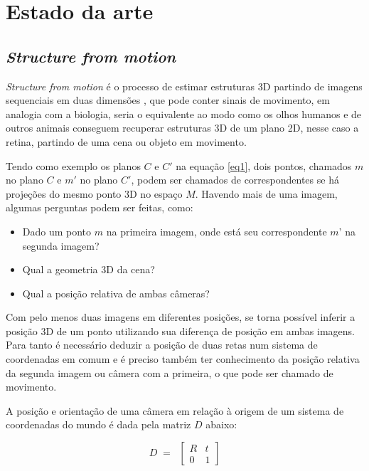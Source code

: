 
\chapter{Estado da arte}

\section{\textit{Structure from motion}}

\textit{Structure from motion} é o processo de estimar estruturas 3D partindo de imagens sequenciais em duas dimensões \cite{SFM}, que pode conter sinais de movimento, em analogia com a biologia, seria o equivalente ao modo  como os olhos humanos e de outros animais conseguem recuperar estruturas 3D de um plano 2D, nesse caso a retina, partindo de uma cena ou objeto em movimento.

Tendo como exemplo os planos $C$ e $C'$ na equação \eqref{eq1}, dois pontos, chamados $m$ no plano $C$ e $m'$ no plano $C'$, podem ser chamados de correspondentes se há projeções do mesmo ponto 3D no espaço $M$. Havendo mais de uma imagem, algumas perguntas podem ser feitas, como:

\begin{itemize}
	\item{Dado um ponto $m$ na primeira imagem, onde está seu correspondente $m’$ na segunda imagem?}
	\item{Qual a geometria 3D da cena?}
	\item{Qual a posição relativa de ambas câmeras?}
\end{itemize}
	
Com pelo menos duas imagens em diferentes posições, se torna possível inferir a posição 3D de um ponto utilizando sua diferença de posição em ambas imagens. Para tanto é necessário deduzir a posição de duas retas num sistema de coordenadas em comum e é preciso também ter conhecimento da posição relativa da segunda imagem ou câmera com a primeira, o que pode ser chamado de movimento.

A posição e orientação de uma câmera em relação à origem de um sistema de coordenadas do mundo é dada pela matriz $D$ abaixo:

\begin{equation}
D \; = \; \; 
\begin{bmatrix}
R & t \\
0 & 1
\end{bmatrix}
\end{equation}

